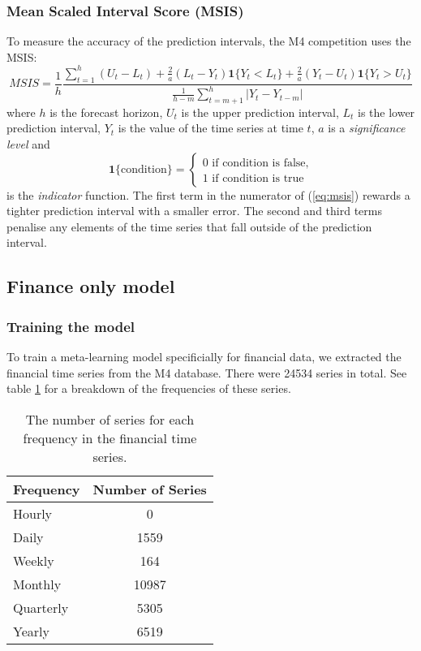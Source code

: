 \documentclass[a4paper,12pt]{article}
\theoremstyle{definition}
\begin{document}
\subsubsection{Mean Scaled Interval Score (MSIS)}
To measure the accuracy of the prediction intervals, the M4 competition uses the MSIS:
\begin{equation}\label{eq:msis}
	MSIS = \frac{1}{h}\frac{\sum_{t=1}^h (U_t - L_t) +  \frac{2}{a}(L_t - Y_t)\mathbf{1}\lbrace Y_t < L_t \rbrace + \frac{2}{a}(Y_t - U_t)\mathbf{1}\lbrace Y_t > U_t \rbrace}{\frac{1}{h-m}\sum_{t=m+1}^h | Y_t - Y_{t-m} |}
\end{equation}
where $h$ is the forecast horizon, $U_t$ is the upper prediction interval, $L_t$ is the lower prediction interval, $Y_t$ is the value of the time series at time $t$, $a$ is a \textit{significance level} and
\begin{equation}
	\mathbf{1}\lbrace \text{condition} \rbrace =	\begin{cases}
								0 \text{ if condition is false,} \\
								1 \text{ if condition is true}
								\end{cases}
\end{equation}
is the \textit{indicator} function. The first term in the numerator of (\ref{eq:msis}) rewards a tighter prediction interval with a smaller error. The second and third terms penalise any elements of the time series that fall outside of the prediction interval.

\subsection{Finance only model}
\subsubsection{Training the model}
To train a meta-learning model specificially for financial data, we extracted the financial time series from the M4 database. There were \num[group-separator={,}]{24534} series in total. See table \ref{tab:frequency_breakdown} for a breakdown of the frequencies of these series.

\begin{table}\label{tab:frequency_breakdown}
  \centering
  \begin{tabular}{| l | c |}
    \hline
    \textbf{Frequency} & \textbf{Number of Series} \\ \hline
    Hourly & 0 \\ \hline
    Daily & 1559 \\ \hline
    Weekly & 164 \\ \hline
    Monthly & 10987 \\ \hline
    Quarterly & 5305 \\ \hline
    Yearly & 6519 \\ \hline
  \end{tabular}
  \caption{The number of series for each frequency in the financial time series.}
  \label{tab:frequency_breakdown}
\end{table}
\end{document}
